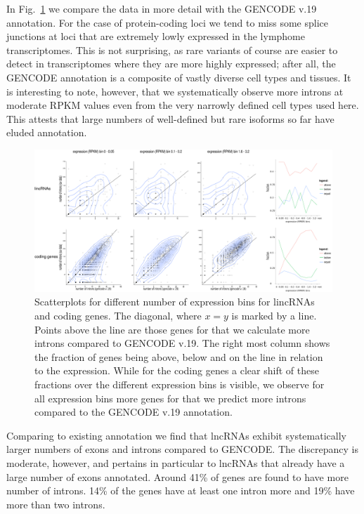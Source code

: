 \documentclass[ncrna,article,submit,moreauthors,pdftex,10pt,a4paper]{mdpi}
\begin{document}
In Fig.~\ref{fig:compare} we compare the  data in more detail with the
GENCODE v.19 annotation. For the case of protein-coding loci we tend to miss
some splice junctions at loci that are extremely lowly expressed in the
lymphome transcriptomes. This is not surprising, as rare variants of course
are easier to detect in transcriptomes where they are more highly
expressed; after all, the GENCODE annotation is a composite of vastly
diverse cell types and tissues. It is interesting to note, however, that we
systematically observe more introns at moderate RPKM values even from the
very narrowly defined cell types used here. This attests that large numbers
of well-defined but rare isoforms so far have eluded annotation. 

\begin{figure}[ht]
  \begin{center}
    \includegraphics[width=\textwidth]{Fig1}
  \end{center}
  \caption{Scatterplots for different number of expression bins for
    lincRNAs and coding genes.  The diagonal, where $x=y$ is marked by
    a line. Points above the line are those genes for that we calculate more
    introns compared to GENCODE v.19.  The right most column shows the
    fraction of genes being above, below and on the line in relation to the
    expression.  While for the coding genes a clear shift of these
    fractions over the different expression bins is visible, we observe for
    all expression bins more genes for that we predict more introns
    compared to the GENCODE v.19 annotation.}
  \label{fig:compare}
\end{figure}

Comparing to existing annotation we find that lncRNAs exhibit
systematically larger numbers of exons and introns compared to GENCODE. The
discrepancy is moderate, however, and pertains in particular to lncRNAs
that already have a large number of exons annotated.  Around 41\% of genes are found to have more number of introns. 14\% of the genes have at least one intron more and 19\% have more than two introns.
\end{document}
